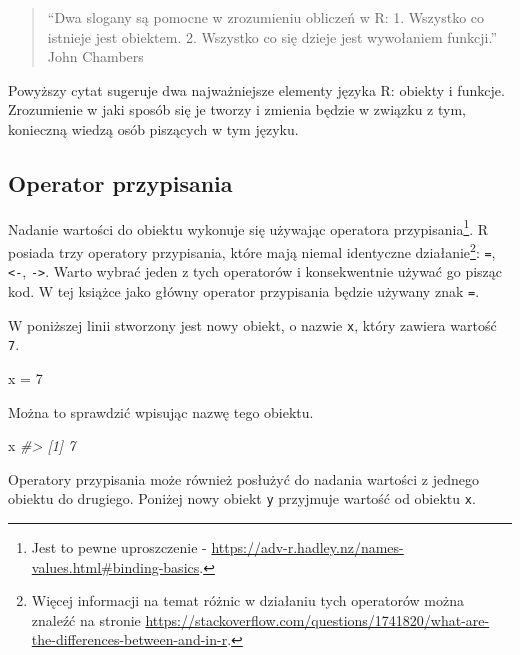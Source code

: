 \documentclass[paper=6in:9in,pagesize=pdftex,headinclude=on,footinclude=on,10pt]{scrbook}
\newenvironment{Shaded}{\begin{snugshade}}{\end{snugshade}}
\newcommand{\CommentTok}[1]{\textcolor[rgb]{0.56,0.35,0.01}{\textit{#1}}}
\newcommand{\DecValTok}[1]{\textcolor[rgb]{0.00,0.00,0.81}{#1}}
\newcommand{\NormalTok}[1]{#1}
\newcommand{\StringTok}[1]{\textcolor[rgb]{0.31,0.60,0.02}{#1}}
\begin{document}
\begin{quote}
``Dwa slogany są pomocne w zrozumieniu obliczeń w R: 1. Wszystko co istnieje jest obiektem. 2. Wszystko co się dzieje jest wywołaniem funkcji.'' John Chambers
\end{quote}

Powyższy cytat sugeruje dwa najważniejsze elementy języka R: obiekty i funkcje.
Zrozumienie w jaki sposób się je tworzy i zmienia będzie w związku z tym, konieczną wiedzą osób piszących w tym języku.

\hypertarget{operator-przypisania}{%
\subsection{Operator przypisania}\label{operator-przypisania}}

Nadanie wartości do obiektu wykonuje się używając operatora przypisania\footnote{Jest to pewne uproszczenie - \url{https://adv-r.hadley.nz/names-values.html\#binding-basics}.}.
R posiada trzy operatory przypisania, które mają niemal identyczne działanie\footnote{Więcej informacji na temat różnic w działaniu tych operatorów można znaleźć na stronie \url{https://stackoverflow.com/questions/1741820/what-are-the-differences-between-and-in-r}.}: \texttt{=}, \texttt{\textless{}-}, \texttt{-\textgreater{}}.
Warto wybrać jeden z tych operatorów i konsekwentnie używać go pisząc kod.
W tej książce jako główny operator przypisania będzie używany znak \texttt{=}.

W poniższej linii stworzony jest nowy obiekt, o nazwie \texttt{x}, który zawiera wartość \texttt{7}.

\begin{Shaded}
\begin{Highlighting}[]
\NormalTok{x =}\StringTok{ }\DecValTok{7}
\end{Highlighting}
\end{Shaded}

Można to sprawdzić wpisując nazwę tego obiektu.

\begin{Shaded}
\begin{Highlighting}[]
\NormalTok{x}
\CommentTok{#> [1] 7}
\end{Highlighting}
\end{Shaded}

Operatory przypisania może również posłużyć do nadania wartości z jednego obiektu do drugiego.
Poniżej nowy obiekt \texttt{y} przyjmuje wartość od obiektu \texttt{x}.
\end{document}
